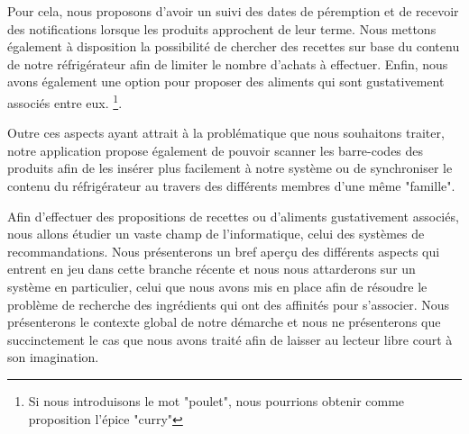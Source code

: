 Pour cela, nous proposons d'avoir un suivi des dates de péremption et de recevoir des notifications lorsque les produits approchent de leur terme. Nous mettons également à disposition la possibilité de chercher des recettes sur base du contenu de notre réfrigérateur afin de limiter le nombre d'achats à effectuer. Enfin, nous avons également une option pour proposer des aliments qui sont gustativement associés entre eux. \footnote{Si nous introduisons le mot "poulet", nous pourrions obtenir comme proposition l'épice "curry"}.

Outre ces aspects ayant attrait à la problématique que nous souhaitons traiter, notre application propose également de pouvoir scanner les barre-codes des produits afin de les insérer plus facilement à notre système ou de synchroniser le contenu du réfrigérateur au travers des différents membres d'une même "famille".

Afin d'effectuer des propositions de recettes ou d'aliments gustativement associés, nous allons étudier un vaste champ de l'informatique, celui des systèmes de recommandations. Nous présenterons un bref aperçu des différents aspects qui entrent en jeu dans cette branche récente et nous nous attarderons sur un système en particulier, celui que nous avons mis en place afin de résoudre le problème de recherche des ingrédients qui ont des affinités pour s'associer. Nous présenterons le contexte global de notre démarche et nous ne présenterons que succinctement le cas que nous avons traité afin de laisser au lecteur libre court à son imagination.